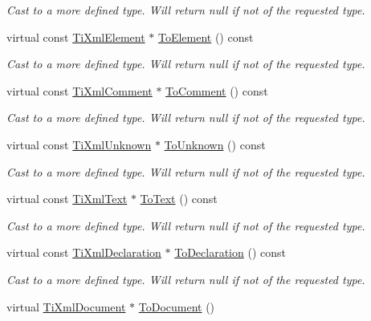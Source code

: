 \begin{DoxyCompactItemize}
\begin{DoxyCompactList}\small\item\em Cast to a more defined type. Will return null if not of the requested type. \end{DoxyCompactList}\item 
virtual const \hyperlink{class_ti_xml_element}{TiXmlElement} $\ast$ \hyperlink{class_ti_xml_node_a72abed96dc9667ab9e0a2a275301bb1c}{ToElement} () const 
\begin{DoxyCompactList}\small\item\em Cast to a more defined type. Will return null if not of the requested type. \end{DoxyCompactList}\item 
virtual const \hyperlink{class_ti_xml_comment}{TiXmlComment} $\ast$ \hyperlink{class_ti_xml_node_aa0a5086f9eaee910bbfdc7f975e26574}{ToComment} () const 
\begin{DoxyCompactList}\small\item\em Cast to a more defined type. Will return null if not of the requested type. \end{DoxyCompactList}\item 
virtual const \hyperlink{class_ti_xml_unknown}{TiXmlUnknown} $\ast$ \hyperlink{class_ti_xml_node_afd7205cf31d7a376929f8a36930627a2}{ToUnknown} () const 
\begin{DoxyCompactList}\small\item\em Cast to a more defined type. Will return null if not of the requested type. \end{DoxyCompactList}\item 
virtual const \hyperlink{class_ti_xml_text}{TiXmlText} $\ast$ \hyperlink{class_ti_xml_node_a95a46a52c525992d6b4ee08beb14cd69}{ToText} () const 
\begin{DoxyCompactList}\small\item\em Cast to a more defined type. Will return null if not of the requested type. \end{DoxyCompactList}\item 
virtual const \hyperlink{class_ti_xml_declaration}{TiXmlDeclaration} $\ast$ \hyperlink{class_ti_xml_node_a9f43e6984fc7d4afd6eb32714c6b7b72}{ToDeclaration} () const 
\begin{DoxyCompactList}\small\item\em Cast to a more defined type. Will return null if not of the requested type. \end{DoxyCompactList}\item 
virtual \hyperlink{class_ti_xml_document}{TiXmlDocument} $\ast$ \hyperlink{class_ti_xml_node_a6a4c8ac28ee7a745d059db6691e03bae}{ToDocument} ()

\end{DoxyCompactItemize}
